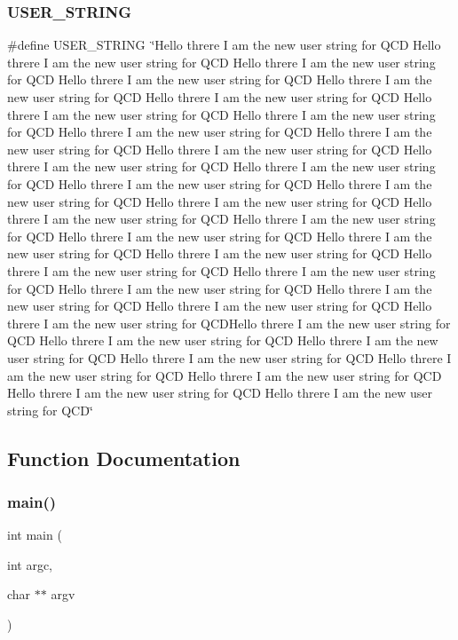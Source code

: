\subsubsection{\texorpdfstring{USER\_STRING}{USER\_STRING}}
{\footnotesize\ttfamily \#define U\+S\+E\+R\+\_\+\+S\+T\+R\+I\+NG~\char`\"{}Hello threre I am the new user string for Q\+CD Hello threre I am the new user string for Q\+CD Hello threre I am the new user string for Q\+CD Hello threre I am the new user string for Q\+CD Hello threre I am the new user string for Q\+CD Hello threre I am the new user string for Q\+CD Hello threre I am the new user string for Q\+CD Hello threre I am the new user string for Q\+CD Hello threre I am the new user string for Q\+CD Hello threre I am the new user string for Q\+CD Hello threre I am the new user string for Q\+CD Hello threre I am the new user string for Q\+CD Hello threre I am the new user string for Q\+CD Hello threre I am the new user string for Q\+CD Hello threre I am the new user string for Q\+CD Hello threre I am the new user string for Q\+CD Hello threre I am the new user string for Q\+CD Hello threre I am the new user string for Q\+CD Hello threre I am the new user string for Q\+CD Hello threre I am the new user string for Q\+CD Hello threre I am the new user string for Q\+CD Hello threre I am the new user string for Q\+CD Hello threre I am the new user string for Q\+CD Hello threre I am the new user string for Q\+CD Hello threre I am the new user string for Q\+CD Hello threre I am the new user string for Q\+CD Hello threre I am the new user string for Q\+C\+D\+Hello threre I am the new user string for Q\+CD  Hello threre I am the new user string for Q\+CD Hello threre I am the new user string for Q\+CD Hello threre I am the new user string for Q\+CD Hello threre I am the new user string for Q\+CD Hello threre I am the new user string for Q\+CD Hello threre I am the new user string for Q\+CD Hello threre I am the new user string for Q\+CD\char`\"{}}



\subsection{Function Documentation}
\mbox{\label{adat-devel_2other__libs_2filedb_2filehash_2treplace_8c_a3c04138a5bfe5d72780bb7e82a18e627}} 
\subsubsection{\texorpdfstring{main()}{main()}}
{\footnotesize\ttfamily int main (\begin{DoxyParamCaption}\item[{int}]{argc,  }\item[{char $\ast$$\ast$}]{argv }\end{DoxyParamCaption})}


